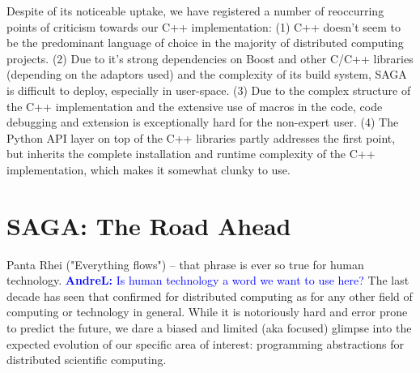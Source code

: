 \documentclass{article}
\newcommand{\B}[1]{\textbf{#1}}
\newcommand{\amnote}[1]{{\textcolor{green}{   \B{AndreM:  } #1 }}}
\newcommand{\alnote}[1]{{\textcolor{blue}{    \B{AndreL:  } #1 }}}
\newcommand{\amnote}[1]{}
\newcommand{\alnote}[1]{}
\begin{document}
  
   Despite of its noticeable uptake, we have registered a number of
   reoccurring points of criticism towards our C++ implementation:
   (1) C++ doesn't seem to be the predominant language of choice
   in the majority of distributed computing projects.
   (2) Due to it's strong dependencies on Boost and other C/C++
   libraries (depending on the adaptors used) and the complexity of its
   build system, SAGA is difficult to deploy, especially in user-space.
   (3) Due to the complex structure of the C++ implementation and the
   extensive use of macros in the code, code debugging and extension
   is exceptionally hard for the non-expert user.
   (4) The Python API layer on top of the C++ libraries partly
   addresses the first point, but inherits the complete installation and
   runtime complexity of the C++ implementation, which makes it somewhat
   clunky to use.




\section{SAGA: The Road Ahead}
\label{sec:road}

 Panta Rhei ("Everything flows") -- that phrase is ever so true for
 human technology.\alnote{Is human technology a word we want to use here?}  
 The last decade has seen that confirmed for
 distributed computing as for any other field of computing or
 technology in general.  While it is notoriously hard and error prone
 to predict the future, we dare a biased and limited (aka focused)
 glimpse into the expected evolution of our specific area of interest:
 programming abstractions for distributed scientific computing. 
\end{document}
